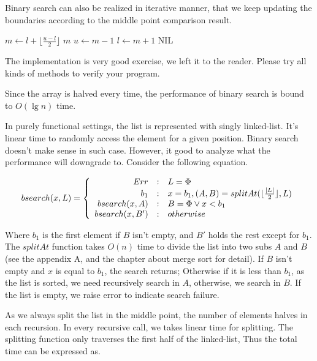 \documentclass[UTF8]{article}
\begin{document}
Binary search can also be realized in iterative manner, that we keep updating the boundaries according to the middle point
comparison result.

\begin{algorithmic}[1]
    \State $m \gets l + \lfloor \frac{u - l}{2} \rfloor$
      \State \Return $m$
    \EndIf
      \State $u \gets m - 1$
    \Else
      \State $l \gets m + 1$
    \EndIf
  \EndWhile
  \Return NIL
\EndFunction
\end{algorithmic}

The implementation is very good exercise, we left it to the reader. Please try all kinds of methods to verify your program.

Since the array is halved every time, the performance of binary search is bound to $O(\lg n)$ time.

In purely functional settings, the list is represented with singly linked-list. It's linear time to randomly access the
element for a given position. Binary search doesn't make sense in such case. However, it good to analyze what the performance
will downgrade to. Consider the following equation.

\[
bsearch(x, L) = \left \{
  \begin{array}
  {r@{\quad:\quad}l}
  Err & L = \Phi \\
  b_1 & x = b_1, (A, B) = splitAt(\lfloor \frac{|L|}{2} \rfloor, L) \\
  bsearch(x, A) & B = \Phi \lor x < b_1 \\
  bsearch(x, B') & otherwise
  \end{array}
\right.
\]

Where $b_1$ is the first element if $B$ isn't empty, and $B'$ holds the rest
except for $b_1$.
The $splitAt$ function takes $O(n)$ time to divide the list into two subs $A$ and $B$
(see the appendix A, and the chapter about merge sort for detail).
If $B$ isn't empty and $x$ is equal to $b_1$, the search returns; Otherwise if it is less than $b_1$, as
the list is sorted, we need recursively search in $A$, otherwise, we search in $B$.
If the list is empty, we raise error to indicate search failure.

As we always split the list in the middle point, the number of elements halves in each
recursion. In every recursive call, we takes linear time for splitting. The splitting
function only traverses the first half of the linked-list, Thus the
total time can be expressed as.
\end{document}
